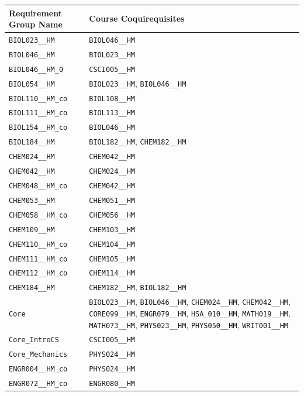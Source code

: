 \begin{longtable}{|p{4.4in}|p{4.4in}|}
    \hline
    Requirement Group Name & Course Coquirequisites\\\hline
    \verb|BIOL023__HM| & \verb|BIOL046__HM|\\\hline
    \verb|BIOL046__HM| & \verb|BIOL023__HM|\\\hline
    \verb|BIOL046__HM_0| & \verb|CSCI005__HM|\\\hline
    \verb|BIOL054__HM| & \verb|BIOL023__HM|, \verb|BIOL046__HM|\\\hline
    \verb|BIOL110__HM_co| & \verb|BIOL108__HM|\\\hline
    \verb|BIOL111__HM_co| & \verb|BIOL113__HM|\\\hline
    \verb|BIOL154__HM_co| & \verb|BIOL046__HM|\\\hline
    \verb|BIOL184__HM| & \verb|BIOL182__HM|, \verb|CHEM182__HM|\\\hline
    \verb|CHEM024__HM| & \verb|CHEM042__HM|\\\hline
    \verb|CHEM042__HM| & \verb|CHEM024__HM|\\\hline
    \verb|CHEM048__HM_co| & \verb|CHEM042__HM|\\\hline
    \verb|CHEM053__HM| & \verb|CHEM051__HM|\\\hline
    \verb|CHEM058__HM_co| & \verb|CHEM056__HM|\\\hline
    \verb|CHEM109__HM| & \verb|CHEM103__HM|\\\hline
    \verb|CHEM110__HM_co| & \verb|CHEM104__HM|\\\hline
    \verb|CHEM111__HM_co| & \verb|CHEM105__HM|\\\hline
    \verb|CHEM112__HM_co| & \verb|CHEM114__HM|\\\hline
    \verb|CHEM184__HM| & \verb|CHEM182__HM|, \verb|BIOL182__HM|\\\hline
    \verb|Core| & \verb|BIOL023__HM|, \verb|BIOL046__HM|, \verb|CHEM024__HM|, \verb|CHEM042__HM|, \verb|CORE099__HM|, \verb|ENGR079__HM|, \verb|HSA_010__HM|, \verb|MATH019__HM|, \verb|MATH073__HM|, \verb|PHYS023__HM|, \verb|PHYS050__HM|, \verb|WRIT001__HM|\\\hline
    \verb|Core_IntroCS| & \verb|CSCI005__HM|\\\hline
    \verb|Core_Mechanics| & \verb|PHYS024__HM|\\\hline
    \verb|ENGR004__HM_co| & \verb|PHYS024__HM|\\\hline
    \verb|ENGR072__HM_co| & \verb|ENGR080__HM|\\\hline

\end{longtable}
